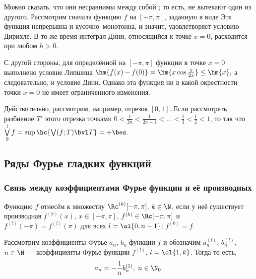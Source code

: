 \documentclass[a4paper]{article}
\begin{document}
Можно сказать, что они несравнимы между собой ; то есть, не вытекают
один из другого. Рассмотрим сначала функцию $f$ на $[-\pi,\pi]$,
заданную в виде  Эта функция
непрерывна и кусочно--монотонна, и значит, удовлетворяет условию
Дирихле. В то же время интеграл Дини, относящийся к точке $x=0$,
 расходится при любом $h>0$.

С другой стороны, для определённой на $[-\pi,\pi]$ функции  в точке $x=0$ выполнено условие Липшица $\hm{f(x) - f(0)} =
\hm{x\cos\frac{\pi}{2x}} \le \hm{x},$ а следовательно, и условие
Дини. Однако эта функция ни в какой окрестности точки $x=0$ не имеет
ограниченного изменения.

Действительно, рассмотрим, например, отрезок $[0,1]$. Если
рассмотреть разбиение $T'$ этого отрезка точками $0<\frac1{2n} <
\frac1{2n-1} < \ldots < \frac13 < \frac12 < 1$, то  так что
$\bigvee\limits_0^1 f = \sup\hc{\bigvee(f;T) \bvl T}=+\bes$.


\subsection{Ряды Фурье гладких функций}
\subsubsection{Связь между коэффициентами Фурье функции и её
производных}

\begin{df}
Функцию $f$ отнесём к множеству $\Rc^{(k)}[-\pi,\pi]$, $k\in\N$,
если у неё существует производная $f^{(k)}(x)$, $x\in[-\pi,\pi]$,
$f^{(k)}\in\Rc[-\pi,\pi]$ и $f^{(l)}(-\pi) = f^{(l)}(\pi)$ для всех
$l=\ol{0,n-1}$; $f^{(0)}=f$.
\end{df}

Рассмотрим коэффициенты Фурье $a_n$, $b_n$ функции $f$ и обозначим
$a_n^{(l)}$, $b_n^{(l)}$, $n\in\N$ --- коэффициенты Фурье функции
$f^{(l)}$, $l=\ol{1,k}$. Тогда  то есть,
$$a_n = -\frac1n b_n^{(1)}, \; n\in\N_0.$$
\end{document}
